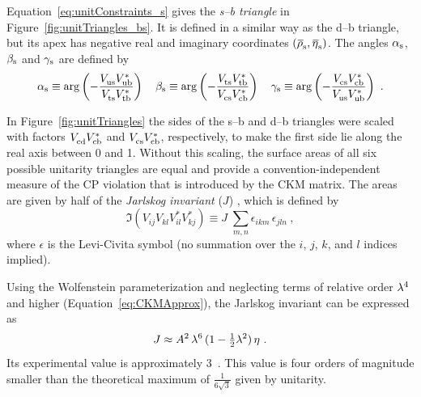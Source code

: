 Equation~\ref{eq:unitConstraints_s} gives the \emph{s--b triangle} in Figure~\ref{fig:unitTriangles_bs}. It is defined in a
similar way as the d--b triangle, but its apex has negative real and imaginary coordinates $(\rhosbar, \etasbar)$. The angles $\alpha_\text{s}$, $\beta_\text{s}$
and $\gamma_\text{s}$ are defined by
\begin{equation}
  \label{eq:bsAnglesDef}
  \as \equiv \arg\left( -\frac{\Vus\Vub[*]}{\Vts\Vtb[*]} \right)
  \quad
  \bs \equiv \arg\left( -\frac{\Vts\Vtb[*]}{\Vcs\Vcb[*]} \right)
  \quad
  \gs \equiv \arg\left( -\frac{\Vcs\Vcb[*]}{\Vus\Vub[*]} \right)
  \ .
\end{equation}

In Figure~\ref{fig:unitTriangles} the sides of the s--b and d--b triangles were scaled with factors $\Vcd\Vcb[*]$ and $\Vcs\Vcb[*]$,
respectively, to make the first side lie along the real axis between 0 and 1. Without this scaling, the surface areas of all six possible
unitarity triangles are equal and provide a convention-independent measure of the CP violation that is introduced by the CKM matrix. The
areas are given by half of the \emph{Jarlskog invariant} ($J$) \cite{Jarlskog:1985ht}, which is defined by
\begin{equation}
  \Im( V^{\phantom{*}}_{ij} V^{\phantom{*}}_{kl} V^{*}_{il} V^{*}_{kj} ) \equiv J\; \sum_{m,n} \epsilon_{ikm}\,\epsilon_{jln}
  \ ,
\end{equation}
where $\epsilon$ is the Levi-Civita symbol (no summation over the $i$, $j$, $k$, and $l$ indices implied).

Using the Wolfenstein parameterization and neglecting terms of relative order $\lambda^4$ and higher (Equation~\ref{eq:CKMApprox}), the
Jarlskog invariant can be expressed as
\begin{equation}
  J \approx A^2\, \lambda^6\, (1-\tfrac{1}{2}\lambda^2)\, \eta
  \ .
\end{equation}
Its experimental value is approximately 3~\cite{Charles:2004jd,Bona:2005vz}. This value is four orders of magnitude smaller
than the theoretical maximum of $\frac{\text{1}}{\text{6}\sqrt{\text{3}}}$ given by unitarity.

